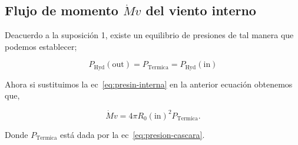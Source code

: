 \documentclass{article}
\newcommand\Out{\ensuremath{\mathrm{out}}}
\newcommand\In{\ensuremath{\mathrm{in}}}
\begin{document}
\subsection{Flujo de momento \(\dot{M}v\) del viento interno}
\label{sec:momento}

Deacuerdo a la suposición 1, existe un equilibrio de presiones de tal manera que podemos establecer;
 
\begin{equation}
  \label{eq:igualda-presion}
  P_{\text{Hyd}}(\Out{})=P_{\text{Termica}}=P_{\text{Hyd}}(\In{})
\end{equation}

Ahora si sustituimos la ec~\ref{eq:presin-interna} en la anterior ecuación obtenemos que,

\begin{equation}
  \label{eq:momentum}
   \dot{M}v = 4 \pi  R_{0}(\In{})^{2}  P_{\text{Termica}}. 
\end{equation}

Donde \(P_{\text{Termica}}\) está dada por la ec~\ref{eq:presion-cascara}. 


\end{document}
